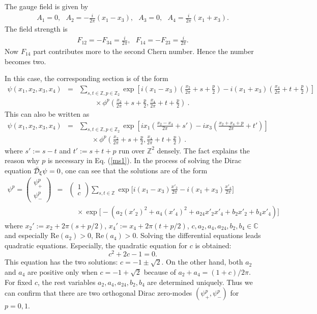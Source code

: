 \documentclass[a4paper,epsf,12pt]{article}
\newcommand{\Z}{{\mathbb{Z}}}
\newcommand{\C}{{\mathbb{C}}}
\newcommand{\bp}{\begin{pmatrix}}
\newcommand{\ep}{\end{pmatrix}}
\newcommand{\fr}{\frac}
\newcommand{\nn}{\nonumber\\}
\def \cDb{{\bar {\cal D}}}
\def \Re{\mathrm{Re}}
\begin{document}
The gauge field is given by
\begin{eqnarray*}
A_1=0,~~~A_2=-\frac{i}{2\pi}%
(x_1-x_3),~~~A_3=0,~~~
A_4=\frac{i}{2\pi}%
(x_1+x_3).
\end{eqnarray*}
The field strength is 
\begin{eqnarray*}
F_{12}=-F_{34}=\fr{i}{2\pi}%
, ~~~F_{14}=-F_{23}=\fr{i}{2\pi}.
\end{eqnarray*}
Now $F_{14}$ part contributes more to the second Chern number.
Hence the number becomes two.

In this case, the corresponding section is of the form
\begin{eqnarray}
 \psi(x_1,x_2,x_3,x_4)
 &=&\sum_{s,t\in\Z, p\in\Z_2}
 \exp{\left[i(x_1-x_3)\left(\frac{x_2}{2\pi}+s+\frac{p}{2}\right)
      -i(x_1+x_3)\left(\frac{x_4}{2\pi}+t+\frac{p}{2}\right)\right]}\nn
 &&~~~~~~~~~~\times\phi^p\left(\frac{x_2}{2\pi}+s+\frac{p}{2},
 \frac{x_4}{2\pi}+t+\frac{p}{2}\right)\ .
 \label{ms1}
\end{eqnarray}
This can also be written as 
\begin{eqnarray*}
 \psi(x_1,x_2,x_3,x_4)
 &=&\sum_{s,t\in\Z, p\in\Z_2}
 \exp{\left[i x_1\left(\frac{x_2-x_4}{2\pi}+s'\right)
      -i x_3\left(\frac{x_2+x_4+p}{2\pi}+t'\right)\right]}\nn 
 &&~~~~~~~~\times
\phi^p\left(\frac{x_2}{2\pi}+s+\frac{p}{2},\frac{x_4}{2\pi}
+t+\frac{p}{2}\right)\ .
\end{eqnarray*}
where $s':=s-t$ and $t':=s+t+p$ run over $\Z^2$ densely. 
The fact explains the reason 
why $p$ is necessary in Eq. (\ref{ms1}). 
%
In the process of solving the Dirac equation $\cDb_\xi\psi=0$, 
one can see that the solutions are of the form
\begin{eqnarray*}
\psi^p= \bp \psi^p_+\\ \psi^p_- \ep
 &=& \bp 1 \\ c \ep
 \sum_{s,t\in\Z}
 \exp{\Big[i(x_1-x_3)
\frac{x'_2}{2\pi}
      -i(x_1+x_3)
\frac{x'_4}{2\pi}
\Big]}\nn
 &&~~~~~\times
 \exp{\Big[-(a_2(x'_2)^2+a_4(x'_4)^2+a_{24}x'_2 x'_4
+b_2 x'_2+ b_4 x'_4)\Big]} 
\end{eqnarray*}
where $x_2':=x_2+2\pi(s+p/2)$, 
$x_4':=x_4+2\pi(t+p/2)$, 
$c, a_2, a_4, a_{24}, b_2, b_4\in\C$ and especially 
$\Re(a_2)>0$, $\Re(a_4)>0$. 
Solving the differential equations leads quadratic equations. 
Especially, the quadratic equation for $c$ is obtained:
\begin{equation*}
 c^2+2c-1=0.
\end{equation*}
This equation has the two solutions: $c=-1\pm\sqrt{2}$.
On the other hand, 
both $a_2$ and $a_4$ are positive only when $c=-1+\sqrt{2}$
because of $a_2+a_4=(1+c)/2\pi$.
For fixed $c$, the rest variables $a_2, a_4, a_{24}, b_2, b_4$ 
are determined uniquely. 
Thus we can confirm that there are two orthogonal Dirac zero-modes 
$(\psi^p_+,\psi^p_-)$ for $p=0, 1$. 
\end{document}
